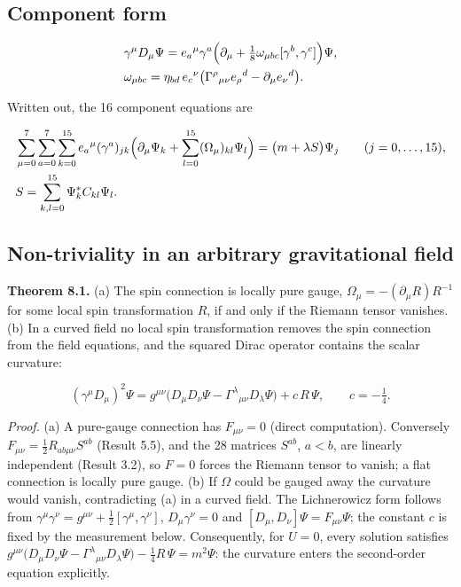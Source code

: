 \documentclass[11pt]{article}
\begin{document}
\subsection{Component form}

\[
\begin{aligned}
&\gamma^\mu D_\mu\Psi=e_a{}^\mu\gamma^a\Bigl(\partial_\mu+\tfrac18\omega_{\mu bc}[\gamma^b,\gamma^c]\Bigr)\Psi,\\
&\omega_{\mu bc}=\eta_{bd}\,e_c{}^\nu\bigl(\Gamma^\rho{}_{\mu\nu}e_\rho{}^d-\partial_\mu e_\nu{}^d\bigr).
\end{aligned}
\]

Written out, the 16 component equations are

\[
\begin{aligned}
&\sum_{\mu=0}^{7}\sum_{a=0}^{7}\sum_{k=0}^{15}e_a{}^\mu(\gamma^a)_{jk}\Bigl(\partial_\mu\Psi_k+\sum_{l=0}^{15}(\Omega_\mu)_{kl}\Psi_l\Bigr)=\bigl(m+\lambda S\bigr)\Psi_j\qquad(j=0,\dots,15),\\
&S=\sum_{k,l=0}^{15}\Psi_k^\ast C_{kl}\Psi_l .
\end{aligned}
\]

\subsection{Non-triviality in an arbitrary gravitational field}

\textbf{Theorem 8.1.} (a) The spin connection is locally pure gauge, $\Omega_\mu=-(\partial_\mu R)R^{-1}$ for some local spin transformation $R$, if and only if the Riemann tensor vanishes. (b) In a curved field no local spin transformation removes the spin connection from the field equations, and the squared Dirac operator contains the scalar curvature:

\[
(\gamma^\mu D_\mu)^2\Psi=g^{\mu\nu}\bigl(D_\mu D_\nu\Psi-\Gamma^\lambda{}_{\mu\nu}D_\lambda\Psi\bigr)+c\,R\,\Psi,\qquad c=-\tfrac14 .
\]

\emph{Proof.} (a) A pure-gauge connection has $F_{\mu\nu}=0$ (direct computation). Conversely $F_{\mu\nu}=\tfrac12R_{ab\mu\nu}S^{ab}$ (Result 5.5), and the 28 matrices $S^{ab}$, $a<b$, are linearly independent (Result 3.2), so $F=0$ forces the Riemann tensor to vanish; a flat connection is locally pure gauge. (b) If $\Omega$ could be gauged away the curvature would vanish, contradicting (a) in a curved field. The Lichnerowicz form follows from $\gamma^\mu\gamma^\nu=g^{\mu\nu}+\tfrac12[\gamma^\mu,\gamma^\nu]$, $D_\mu\gamma^\nu=0$ and $[D_\mu,D_\nu]\Psi=F_{\mu\nu}\Psi$; the constant $c$ is fixed by the measurement below. Consequently, for $U=0$, every solution satisfies $g^{\mu\nu}\bigl(D_\mu D_\nu\Psi-\Gamma^\lambda{}_{\mu\nu}D_\lambda\Psi\bigr)-\tfrac14R\,\Psi=m^2\Psi$: the curvature enters the second-order equation explicitly.
\end{document}
